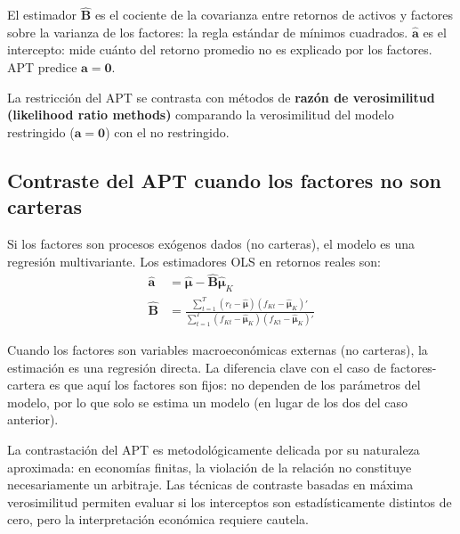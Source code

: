 \documentclass[12pt]{article}
\begin{document}
\begin{intuicionmat}
El estimador $\hat{\mathbf{B}}$ es el cociente de la covarianza entre retornos de activos y factores sobre la varianza de los factores: la regla est\'andar de m\'inimos cuadrados. $\hat{\mathbf{a}}$ es el intercepto: mide cu\'anto del retorno promedio no es explicado por los factores. APT predice $\mathbf{a} = \mathbf{0}$.
\end{intuicionmat}

La restricci\'on del APT se contrasta con m\'etodos de \textbf{raz\'on de verosimilitud (likelihood ratio methods)} comparando la verosimilitud del modelo restringido ($\mathbf{a} = \mathbf{0}$) con el no restringido.

\subsection{Contraste del APT cuando los factores no son carteras}

Si los factores son procesos ex\'ogenos dados (no carteras), el modelo es una regresi\'on multivariante. Los estimadores OLS en retornos reales son:
\begin{align}
    \hat{\mathbf{a}} &= \hat{\boldsymbol{\mu}} - \hat{\mathbf{B}}\hat{\boldsymbol{\mu}}_K \\
    \hat{\mathbf{B}} &= \frac{\sum_{t=1}^{T}(r_t - \hat{\boldsymbol{\mu}})(f_{Kt} - \hat{\boldsymbol{\mu}}_K)'}{\sum_{t=1}^{T}(f_{Kt} - \hat{\boldsymbol{\mu}}_K)(f_{Kt} - \hat{\boldsymbol{\mu}}_K)'}
\end{align}

\begin{intuicionmat}
Cuando los factores son variables macroecon\'omicas externas (no carteras), la estimaci\'on es una regresi\'on directa. La diferencia clave con el caso de factores-cartera es que aqu\'i los factores son fijos: no dependen de los par\'ametros del modelo, por lo que solo se estima un modelo (en lugar de los dos del caso anterior).
\end{intuicionmat}

\begin{intuicion}
La contrastaci\'on del APT es metodol\'ogicamente delicada por su naturaleza aproximada: en econom\'ias finitas, la violaci\'on de la relaci\'on no constituye necesariamente un arbitraje. Las t\'ecnicas de contraste basadas en m\'axima verosimilitud permiten evaluar si los interceptos son estad\'isticamente distintos de cero, pero la interpretaci\'on econ\'omica requiere cautela.
\end{intuicion}
\end{document}
